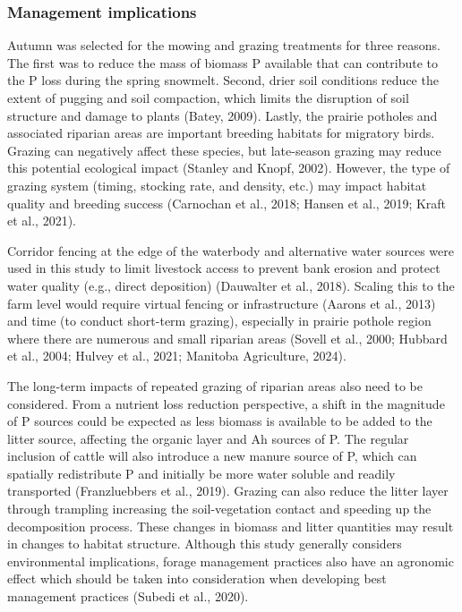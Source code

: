 \documentclass[
]{agujournal2019}
\begin{document}
\subsubsection{Management implications}\label{management-implications}

Autumn was selected for the mowing and grazing treatments for three
reasons. The first was to reduce the mass of biomass P available that
can contribute to the P loss during the spring snowmelt. Second, drier
soil conditions reduce the extent of pugging and soil compaction, which
limits the disruption of soil structure and damage to plants (Batey,
2009). Lastly, the prairie potholes and associated riparian areas are
important breeding habitats for migratory birds. Grazing can negatively
affect these species, but late-season grazing may reduce this potential
ecological impact (Stanley and Knopf, 2002). However, the type of
grazing system (timing, stocking rate, and density, etc.) may impact
habitat quality and breeding success (Carnochan et al., 2018; Hansen et
al., 2019; Kraft et al., 2021).

Corridor fencing at the edge of the waterbody and alternative water
sources were used in this study to limit livestock access to prevent
bank erosion and protect water quality (e.g., direct deposition)
(Dauwalter et al., 2018). Scaling this to the farm level would require
virtual fencing or infrastructure (Aarons et al., 2013) and time (to
conduct short-term grazing), especially in prairie pothole region where
there are numerous and small riparian areas (Sovell et al., 2000;
Hubbard et al., 2004; Hulvey et al., 2021; Manitoba Agriculture, 2024).

The long-term impacts of repeated grazing of riparian areas also need to
be considered. From a nutrient loss reduction perspective, a shift in
the magnitude of P sources could be expected as less biomass is
available to be added to the litter source, affecting the organic layer
and Ah sources of P. The regular inclusion of cattle will also introduce
a new manure source of P, which can spatially redistribute P and
initially be more water soluble and readily transported (Franzluebbers
et al., 2019). Grazing can also reduce the litter layer through
trampling increasing the soil-vegetation contact and speeding up the
decomposition process. These changes in biomass and litter quantities
may result in changes to habitat structure. Although this study
generally considers environmental implications, forage management
practices also have an agronomic effect which should be taken into
consideration when developing best management practices (Subedi et al.,
2020).
\end{document}

